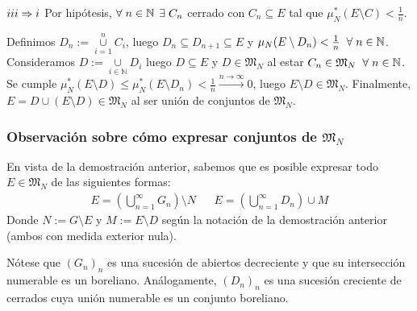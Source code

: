 \documentclass[12pt,a4paper]{article}
\newcommand{\N}{\mathbb{N}}
\newcommand{\smallcup}{\mathop{\cup}\limits}
\newcounter{unit}[section]
\newcounter{chapter}[unit]
\renewcommand{\theunit}{\arabic{unit}}
\renewcommand{\thechapter}{\arabic{chapter}}
\renewcommand{\thesubsubsection}{\theunit.\thechapter.\arabic{subsubsection}}
\newcommand{\result}[1]{%
  \subsubsection{#1}%
  \label{result:\thesubsubsection}
}
\begin{document}
\vspace{6mm}
\begin{tcolorbox}
    \hspace{-4mm} $\romannumeral 3 \Rightarrow \romannumeral 1$ \hspace{2mm} Por hipótesis, $\forall \hspace{1mm}  n \in \N$
    $\exists \hspace{1mm} C_n$ cerrado con $C_n \subseteq E$ tal que $\mu^*_N(E \setminus C) < \frac{1}{n}$.
\end{tcolorbox}
Definimos $D_n := \smallcup_{i=1}^n C_i$, luego $D_n \subseteq D_{n+1} \subseteq E$ y $\mu_N(E \setminus D_n) < \frac{1}{n} \hspace{2mm} \forall \hspace{1mm} n \in \N$.
\vspace{1mm} \newline Consideramos $D:= \smallcup_{i\in\N} D_i$ luego $D \subseteq E$ y $D \in \mathfrak{M}_N$ al estar $C_n \in \mathfrak{M}_N \hspace{2mm} \forall \hspace{1mm} n \in \N$.
\vspace{1mm} \newline Se cumple $\mu^*_N(E \setminus D) \leq \mu^*_N(E \setminus D_n) < \frac{1}{n} \xrightarrow{n \to \infty} 0$, luego $E \setminus D \in \mathfrak{M}_N$.
\vspace{1mm} \newline Finalmente, $E = D \cup (E \setminus D) \in \mathfrak{M}_N$ al ser unión de conjuntos de $\mathfrak{M}_N$.

\vspace{6mm}
\result{Observación sobre cómo expresar conjuntos de \texorpdfstring{$\mathfrak{M}_N$}{M\_n}}
\hspace{3mm} En vista de la demostración anterior, sabemos que es posible expresar todo $E \in \mathfrak{M}_N$ de las siguientes formas:
\begin{align*}
    E = \left(\bigcup_{n=1}^\infty G_n\right) \setminus N && E = \left(\bigcup_{n=1}^\infty D_n\right) \cup M
\end{align*}
Donde $N := G \setminus E$ y $M := E \setminus D$ según la notación de la demostración anterior (ambos con medida exterior nula).

\vspace{2mm}
Nótese que $(G_n)_n$ es una sucesión de abiertos decreciente y que su intersección numerable es un boreliano. Análogamente, $(D_n)_n$ es una sucesión creciente de cerrados cuya unión numerable es un conjunto boreliano.
\end{document}
